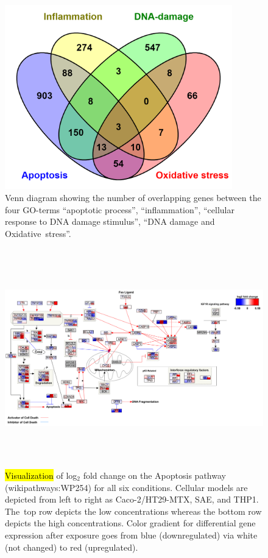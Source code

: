 \documentclass[ijms,article,accept,moreauthors,pdftex]{Definitions/mdpi}
\begin{document}
\begin{paracol}{2}
\begin{figure}[H]
\includegraphics[height=8cm,keepaspectratio]{figA1.png}
\caption{Venn diagram showing the number of overlapping genes between the four GO-terms “apoptotic process”, “inflammation”, “cellular response to DNA damage stimulus”, “DNA damage and Oxidative~stress”.
}
\label{fig:figA1}
\end{figure}
\vspace{-12pt}

\clearpage
\end{paracol}
\nointerlineskip
\renewcommand{\thefigure}{A\arabic{figure}}
\begin{figure}[H]
\widefigure
\includegraphics[height=9.5cm,keepaspectratio]{figA2.png}
\caption{\hl{Visualization} of log$_{2}$ fold change on the Apoptosis pathway (wikipathways:WP254) for all six conditions.
{Cellular models} are depicted from left to right as {Caco-2/HT29-MTX}, SAE, and THP1. The~top row depicts the low concentrations whereas the bottom row depicts the high concentrations. {Color gradient for differential gene expression after exposure goes from blue (downregulated) via white (not changed) to red (upregulated).}
}
\label{fig:figA2}
\end{figure}
\end{document}
